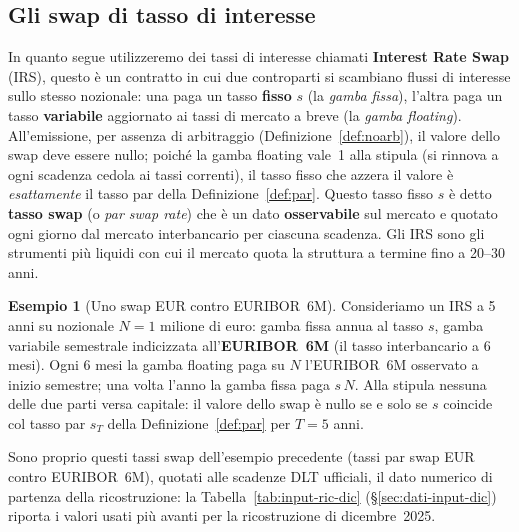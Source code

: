 \documentclass[11pt,a4paper]{article}
\theoremstyle{plain}
\theoremstyle{definition}
\newtheorem{esempio}[teorema]{Esempio}
\theoremstyle{remark}
\begin{document}
\subsection{Gli swap di tasso di interesse}
\label{sec:swap}
In quanto segue utilizzeremo dei tassi di interesse chiamati \textbf{Interest Rate Swap} (IRS), questo \`e un contratto in cui due controparti si scambiano
flussi di interesse sullo stesso nozionale: una paga un tasso \textbf{fisso} $s$ (la
\emph{gamba fissa}), l'altra paga un tasso \textbf{variabile} aggiornato ai tassi di
mercato a breve (la \emph{gamba floating}). All'emissione, per assenza di arbitraggio
(Definizione~\ref{def:noarb}), il valore dello swap deve essere nullo; poich\'e la gamba
floating vale~1 alla stipula (si rinnova a ogni scadenza cedola ai tassi correnti), il
tasso fisso che azzera il valore \`e \emph{esattamente} il tasso par della
Definizione~\ref{def:par}. Questo tasso fisso $s$ \`e detto \textbf{tasso swap} (o
\emph{par swap rate}) che è un dato
\textbf{osservabile} sul mercato e quotato ogni giorno dal mercato interbancario per ciascuna scadenza. Gli IRS sono gli strumenti pi\`u liquidi con cui il mercato quota la struttura a
termine fino a 20--30 anni.

\begin{esempio}[Uno swap EUR contro EURIBOR~6M]
\label{ex:swap-euribor}
Consideriamo un IRS a 5 anni su nozionale $N=1$ milione di euro: gamba fissa annua al tasso
$s$, gamba variabile semestrale indicizzata all'\textbf{EURIBOR~6M} (il tasso interbancario a
6 mesi). Ogni 6 mesi la gamba floating paga su $N$ l'EURIBOR~6M osservato a inizio semestre;
una volta l'anno la gamba fissa paga $s\,N$. Alla stipula nessuna delle due parti versa
capitale: il valore dello swap \`e nullo se e solo se $s$ coincide col tasso par $s_T$ della
Definizione~\ref{def:par} per $T=5$ anni. %
\end{esempio}

Sono proprio questi tassi swap dell'esempio precedente (tassi par swap EUR contro
EURIBOR~6M), quotati alle scadenze DLT ufficiali, il dato numerico di
partenza della ricostruzione: la Tabella~\ref{tab:input-ric-dic} (\S\ref{sec:dati-input-dic})
riporta i valori usati pi\`u avanti per la ricostruzione di dicembre~2025. %
\end{document}
